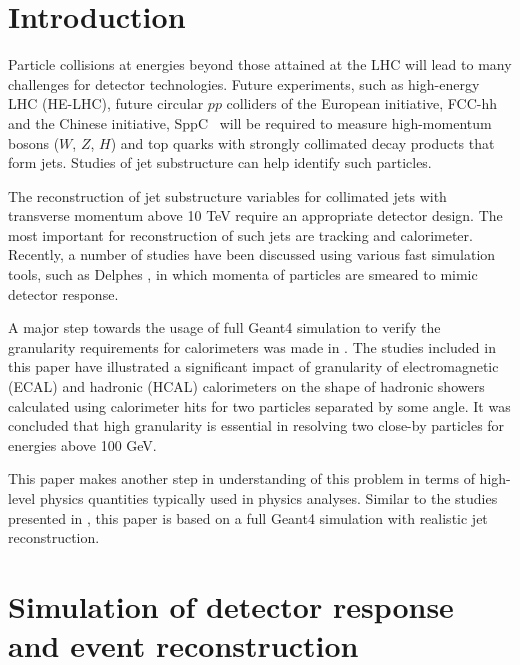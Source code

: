 \documentclass[final,1p,11pt]{elsarticle}
\begin{document}
\linenumbers

\section{Introduction}

Particle collisions at energies  beyond those attained at the LHC will lead to many challenges for detector technologies.
Future experiments, such as high-energy LHC (HE-LHC),
future circular $pp$ colliders of the European initiative, FCC-hh~\cite{Benedikt:2206376} and the Chinese initiative, SppC~\cite{Tang:2015qga} will be required to measure high-momentum bosons ($W$, $Z$, $H$) and top quarks with strongly 
collimated decay products that form jets.  Studies of jet substructure can help identify such particles.

The reconstruction of jet substructure  variables for collimated jets with transverse momentum above 10 TeV 
require an appropriate detector design. The most important for reconstruction of such jets are tracking and calorimeter.
Recently, a number of studies \cite{Calkins:2013ega,Chekanov:2015ihl,Coleman:2017fiq} 
have been discussed using various fast simulation tools, such as 
Delphes  \cite{deFavereau:2013fsa}, in which momenta of particles
are smeared to mimic detector response. 

A major step towards the usage of full Geant4 simulation to verify the granularity requirements 
for calorimeters was made in \cite{Chekanov:2016ppq}.
The studies included in this paper have illustrated a significant impact 
of granularity of electromagnetic (ECAL) and hadronic (HCAL) calorimeters on the
shape of hadronic showers  calculated using calorimeter hits 
for two particles separated  by some angle. It was concluded that high granularity is essential 
in resolving two close-by particles for energies above 100 GeV. 

This paper makes another step in  understanding of this problem in terms 
of high-level physics quantities typically used in physics analyses.
Similar to the studies presented in \cite{Chekanov:2016ppq}, this paper is based on a full
Geant4 simulation with realistic jet reconstruction.

\section{Simulation of detector response and event reconstruction}
 
\end{document}
